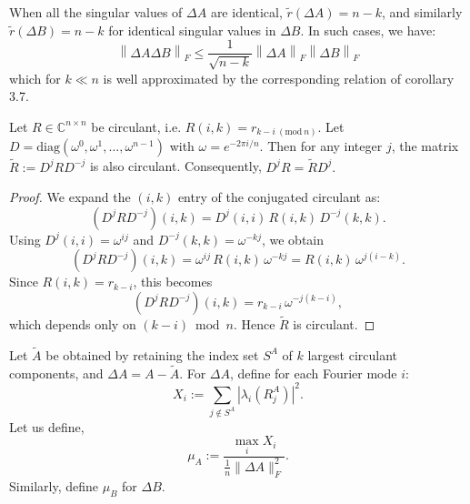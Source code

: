 \documentclass[onefignum,onetabnum]{siamart171218}
\newcommand{\normF}[1]{\left\|#1\right\|_F}
\newcommand{\DA}{\Delta\!A}
\newcommand{\DB}{\Delta\!B}
\newcommand{\rtilde}{\tilde{r}}
\begin{document}
\begin{corollary}
    When all the singular values of $\DA$ are identical, $\rtilde(\DA)=n-k$, and similarly $\rtilde(\DB)=n-k$ for identical singular values in $\Delta B$. In such cases, we have:
    $$\normF{\DA \DB} \leq \frac{1}{\sqrt{n-k}}\normF{\DA} \normF{\DB}$$
    which for $k \ll n$ is well approximated by the corresponding relation of corollary 3.7.
\end{corollary}

\begin{lemma}\label{lem:circulant-conjugation}

Let $R \in \mathbb{C}^{n \times n}$ be circulant, i.e. $R(i,k) = r_{k-i \ (\mathrm{mod}\ n)}.$ Let $D = \mathrm{diag}(\omega^0, \omega^1, \dots, \omega^{n-1})$ with $\omega = e^{-2\pi i / n}.$ Then for any integer $j$, the matrix $\widetilde{R} := D^j R D^{-j}$ is also circulant. Consequently, $D^j R = \widetilde{R} D^j.$
\end{lemma}

\begin{proof}
We expand the $(i,k)$ entry of the conjugated circulant as:
\[
(D^j R D^{-j})(i,k)
= D^j(i,i)\, R(i,k)\, D^{-j}(k,k).
\]
Using $D^j(i,i) = \omega^{ij}$ and $D^{-j}(k,k) = \omega^{-kj}$, we obtain
\[
(D^j R D^{-j})(i,k)
=
\omega^{ij} \, R(i,k) \, \omega^{-kj}
=
R(i,k)\, \omega^{j(i-k)}.
\]
Since $R(i,k) = r_{k-i}$, this becomes
\[
(D^j R D^{-j})(i,k)
=
r_{k-i}\, \omega^{-j(k-i)},
\]
which depends only on $(k-i) \bmod n$. Hence $\widetilde{R}$ is circulant.
\end{proof}

\begin{definition}
Let $\tilde{A}$ be obtained by retaining the index set $S^A$ of $k$ largest circulant components, and $\DA = A - \tilde{A}$. For $\Delta A$, define for each Fourier mode $i$:
\[
X_i := \sum_{j \notin S^A} |\lambda_i(R_j^A)|^2.
\]
Let us define,
\[
\mu_A := \frac{\max_i X_i}{\frac{1}{n}\|\Delta A\|_F^2}.
\]
Similarly, define $\mu_B$ for $\Delta B$.
\end{definition}
\end{document}
